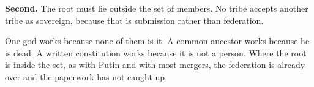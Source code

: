\documentclass[11pt,a4paper]{article}
\begin{document}
\begin{alarmbox}
\textbf{Second.} The root must lie outside the set of members. No tribe accepts
another tribe as sovereign, because that is submission rather than federation.

One god works because none of them is it. A common ancestor works because he is
dead. A written constitution works because it is not a person. Where the root is
inside the set, as with Putin and with most mergers, the federation is already over
and the paperwork has not caught up.
\end{alarmbox}
\end{document}
